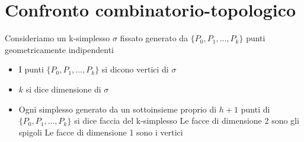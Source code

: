 \documentclass[a4paper]{report}
\newcommand{\geoind}[1]{geometricamente indipendent{#1} }
\newcommand{\pointset}{\ensuremath{\{P_0,P_1,\dots,P_k\}} }
\begin{document}
\section{Confronto combinatorio-topologico}
Consideriamo un k-simplesso $\sigma$ fissato generato da \pointset punti \geoind{i}
\begin{itemize}
    \item I punti \pointset si dicono vertici di $\sigma$
    \item $k$ si dice dimensione di $\sigma$
    \item Ogni simplesso generato da un sottoinsieme proprio di $h+1$ punti di \pointset si dice faccia del k-simplesso
          \subitem Le facce di dimensione 2 sono gli spigoli
          \subitem Le facce di dimensione 1 sono i vertici
          \begin{center}



              \begin{tikzpicture}[x=0.75pt,y=0.75pt,yscale=-1,xscale=1]


\end{tikzpicture}
\end{center}
\end{itemize}
\end{document}
